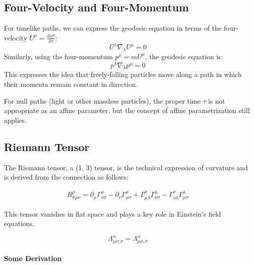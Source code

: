 \documentclass[11pt,letterpaper]{book}
\begin{document}
\subsection{Four-Velocity and Four-Momentum}

For timelike paths, we can express the geodesic equation in terms of the four-velocity \( U^\mu = \frac{dx^\mu}{d\tau} \):
\[
U^\lambda \nabla_\lambda U^\mu = 0
\]
Similarly, using the four-momentum \( p^\mu = m U^\mu \), the geodesic equation is:
\[
p^\lambda \nabla_\lambda p^\mu = 0
\]
This expresses the idea that freely-falling particles move along a path in which their momenta remain constant in direction.

For null paths (light or other massless particles), the proper time \( \tau \) is not appropriate as an affine parameter, but the concept of affine parametrization still applies.




\subsection{Riemann Tensor}
The Riemann tensor, a (1, 3) tensor, is the technical expression of curvature and is derived from the connection as follows:

\begin{align}
R^\rho_{\sigma\mu\nu} = \partial_\mu \Gamma^\rho_{\nu\sigma} - \partial_\nu \Gamma^\rho_{\mu\sigma} + \Gamma^\rho_{\mu\lambda} \Gamma^\lambda_{\nu\sigma} - \Gamma^\rho_{\nu\lambda} \Gamma^\lambda_{\mu\sigma}
\end{align}

This tensor vanishes in flat space and plays a key role in Einstein's field equations.

\[
\Lambda^{\alpha}_{\mu\nu;\sigma} = \Lambda^{\alpha}_{\mu\nu,\sigma}
\]


\paragraph{Some Derivation}
\end{document}
